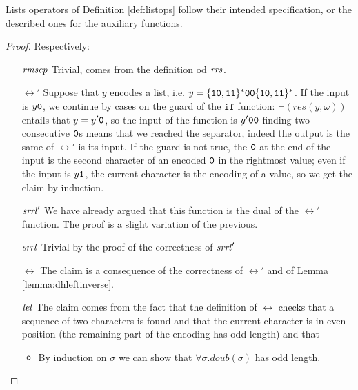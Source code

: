   \begin{remark}
    \label{rem:corrlistops}
    Lists operators of Definition \ref{def:listops} follow their
    intended specification, or the described ones for the auxiliary functions.
  \end{remark}
  \begin{proof}
    Respectively:
    \begin{itemize}
      \item [$\mathit{rmsep}$] Trivial, comes from the definition od $\mathit{rrs}$.
      \item [$\rel'$] Suppose that $y$ encodes a list, i.e. $y=\{\mathtt{1}\mathtt{0},
       \mathtt{1}\mathtt{1}\}^*\mathtt{0}\mathtt{0}\{\mathtt{1}\mathtt{0}, \mathtt{1}\mathtt{1}\}^*$.
       If the input is $y\mathtt{0}$, we
       continue by cases on the guard of the $\mathtt{if}$ function:
       $\lnot (res(y, \omega))$ entails that $y=y'\mathtt{0}$, so the input of
       the function is $y'\mathtt{0}\mathtt{0}$ finding two consecutive $\mathtt{0}$s
       means that we reached the separator, indeed the output is the same
       of $\rel'$ is its input. If the guard is not true, the $\mathtt{0}$ at the end of the
       input is the second character of an encoded $\mathtt{0}$ in the rightmost
       value; even if the input is $y\mathtt{1}$, the current character is the encoding
       of a value, so we get the claim by induction.
      \item[$\mathit{srrl}'$] We have already argued that this function is the
      dual of the $\rel'$ function.
      The proof is a slight variation of the previous.
      \item[$\mathit{srrl}$] Trivial by the proof of the correctness of $\mathit{srrl}'$
      \item[$\rel$] The claim is a consequence of the correctness of $\rel'$
        and of Lemma \ref{lemma:dhleftinverse}.
      \item[$\mathit{lel}$] The claim comes from the fact that the definition of $\rel$
      checks that a sequence of two characters is found and that the current
      character is in even position (the remaining part of the encoding has
      odd length) and that
      \begin{itemize}
        \item By induction on $\sigma$ we can show that
        $\forall \sigma.\mathit{doub}(\sigma)$ has odd length.

\end{itemize}
\end{itemize}
\end{proof}

